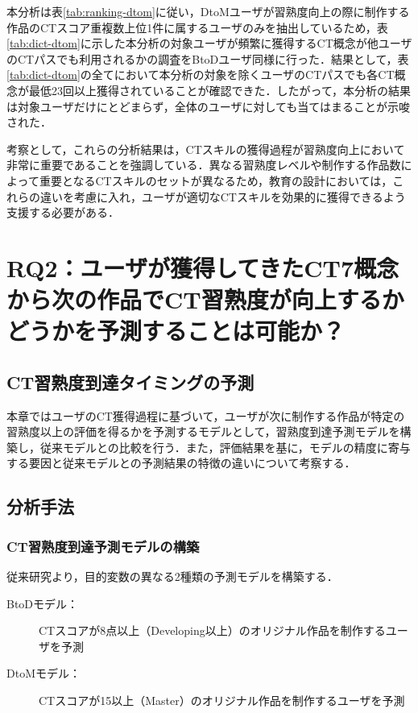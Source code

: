 \documentclass[11pt,dvipdfmx]{jreport}
\begin{document}
本分析は表\ref{tab:ranking-dtom}に従い，DtoMユーザが習熟度向上の際に制作する作品のCTスコア重複数上位1件に属するユーザのみを抽出しているため，表\ref{tab:dict-dtom}に示した本分析の対象ユーザが頻繁に獲得するCT概念が他ユーザのCTパスでも利用されるかの調査をBtoDユーザ同様に行った．結果として，表\ref{tab:dict-dtom}の全てにおいて本分析の対象を除くユーザのCTパスでも各CT概念が最低23回以上獲得されていることが確認できた．したがって，本分析の結果は対象ユーザだけにとどまらず，全体のユーザに対しても当てはまることが示唆された．

\vspace{5mm}


考察として，これらの分析結果は，CTスキルの獲得過程が習熟度向上において非常に重要であることを強調している．異なる習熟度レベルや制作する作品数によって重要となるCTスキルのセットが異なるため，教育の設計においては，これらの違いを考慮に入れ，ユーザが適切なCTスキルを効果的に獲得できるよう支援する必要がある．

\chapter{RQ2：ユーザが獲得してきたCT7概念から次の作品でCT習熟度が向上するかどうかを予測することは可能か？}
\section{CT習熟度到達タイミングの予測}
本章ではユーザのCT獲得過程に基づいて，ユーザが次に制作する作品が特定の習熟度以上の評価を得るかを予測するモデルとして，習熟度到達予測モデルを構築し，従来モデルとの比較を行う．また，評価結果を基に，モデルの精度に寄与する要因と従来モデルとの予測結果の特徴の違いについて考察する．
\section{分析手法}
\subsection{CT習熟度到達予測モデルの構築}
従来研究より，目的変数の異なる2種類の予測モデルを構築する．

\begin{description}
\item [BtoDモデル：]CTスコアが8点以上（Developing以上）のオリジナル作品を制作するユーザを予測
\item [DtoMモデル：]CTスコアが15以上（Master）のオリジナル作品を制作するユーザを予測
\end{description}
\end{document}
